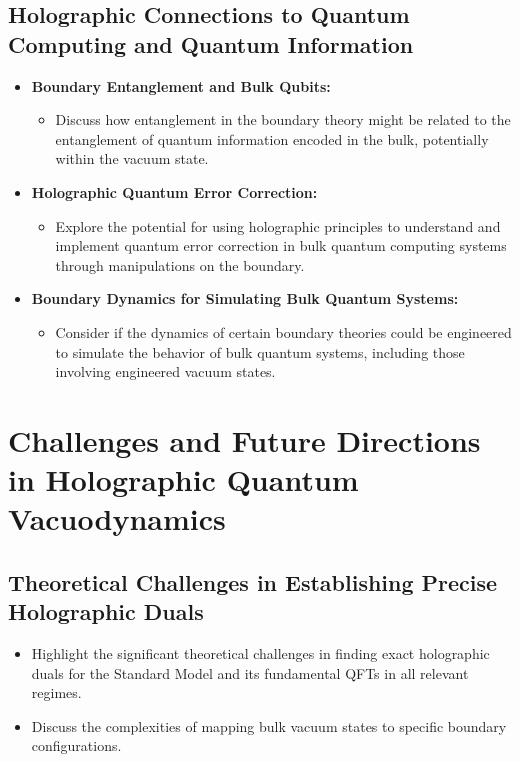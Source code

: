 \documentclass{amsart}
\begin{document}
\subsection{Holographic Connections to Quantum Computing and Quantum Information}
\begin{itemize}
    \item \textbf{Boundary Entanglement and Bulk Qubits:}
        \begin{itemize}
            \item Discuss how entanglement in the boundary theory might be related to the entanglement of quantum information encoded in the bulk, potentially within the vacuum state.
        \end{itemize}
    \item \textbf{Holographic Quantum Error Correction:}
        \begin{itemize}
            \item Explore the potential for using holographic principles to understand and implement quantum error correction in bulk quantum computing systems through manipulations on the boundary.
        \end{itemize}
    \item \textbf{Boundary Dynamics for Simulating Bulk Quantum Systems:}
        \begin{itemize}
            \item Consider if the dynamics of certain boundary theories could be engineered to simulate the behavior of bulk quantum systems, including those involving engineered vacuum states.
        \end{itemize}
\end{itemize}

\section{Challenges and Future Directions in Holographic Quantum Vacuodynamics}

\subsection{Theoretical Challenges in Establishing Precise Holographic Duals}
\begin{itemize}
    \item Highlight the significant theoretical challenges in finding exact holographic duals for the Standard Model and its fundamental QFTs in all relevant regimes.
    \item Discuss the complexities of mapping bulk vacuum states to specific boundary configurations.
\end{itemize}
\end{document}
